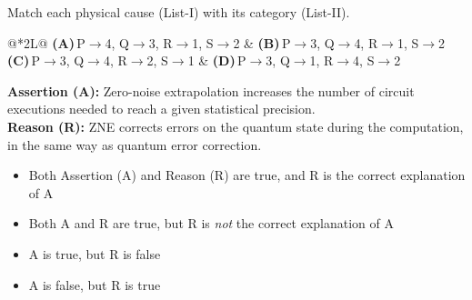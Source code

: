 \documentclass[11pt,a4paper]{article}
\newcommand{\optlabel}[1]{\textbf{(#1)}}
\newenvironment{qitem}[1]{\begin{list}{}{\setlength{\leftmargin}{3.3em}\setlength{\labelwidth}{3.1em}%
  \setlength{\labelsep}{0.2em}\setlength{\topsep}{3pt}\setlength{\parsep}{3pt}}\item[\textbf{Q.#1}\hfill]}{\end{list}}
\newcommand{\qsep}{\par\vspace{2pt}{\color{black!15}\hrule}\vspace{4pt}}
\begin{document}
\begin{qitem}{76}
Match each physical cause (List-I) with its category (List-II).
\par\smallskip{}
\par\smallskip\noindent\begin{tabularx}{\linewidth}{@{}*{2}{L}@{}}
\optlabel{A}\,P$\to$4, Q$\to$3, R$\to$1, S$\to$2 & \optlabel{B}\,P$\to$3, Q$\to$4, R$\to$1, S$\to$2 \\[3pt]
\optlabel{C}\,P$\to$3, Q$\to$4, R$\to$2, S$\to$1 & \optlabel{D}\,P$\to$3, Q$\to$1, R$\to$4, S$\to$2
\end{tabularx}
\end{qitem}
\qsep

\begin{qitem}{77}
\textbf{Assertion (A):} Zero-noise extrapolation increases the number of circuit executions needed to reach a given statistical precision.\\[1mm]
\textbf{Reason (R):} ZNE corrects errors on the quantum state during the computation, in the same way as quantum error correction.
\begin{itemize}[leftmargin=2.6em, labelsep=0.4em, itemsep=2pt, topsep=3pt]
\item[\optlabel{A}] Both Assertion (A) and Reason (R) are true, and R is the correct explanation of A
\item[\optlabel{B}] Both A and R are true, but R is \emph{not} the correct explanation of A
\item[\optlabel{C}] A is true, but R is false
\item[\optlabel{D}] A is false, but R is true
\end{itemize}
\end{qitem}
\qsep
\end{document}
